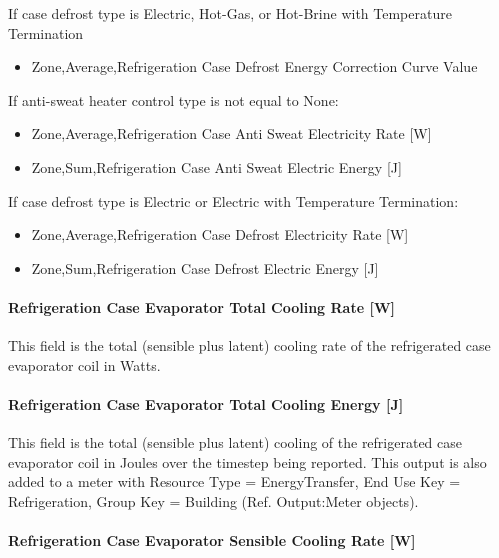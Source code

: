 If case defrost type is Electric, Hot-Gas, or Hot-Brine with Temperature Termination

\begin{itemize}
\tightlist
\item
  Zone,Average,Refrigeration Case Defrost Energy Correction Curve Value
\end{itemize}

If anti-sweat heater control type is not equal to None:

\begin{itemize}
\item
  Zone,Average,Refrigeration Case Anti Sweat Electricity Rate {[}W{]}
\item
  Zone,Sum,Refrigeration Case Anti Sweat Electric Energy {[}J{]}
\end{itemize}

If case defrost type is Electric or Electric with Temperature Termination:

\begin{itemize}
\item
  Zone,Average,Refrigeration Case Defrost Electricity Rate {[}W{]}
\item
  Zone,Sum,Refrigeration Case Defrost Electric Energy {[}J{]}
\end{itemize}

\paragraph{Refrigeration Case Evaporator Total Cooling Rate {[}W{]}}\label{refrigeration-case-evaporator-total-cooling-rate-w}

This field is the total (sensible plus latent) cooling rate of the refrigerated case evaporator coil in Watts.

\paragraph{Refrigeration Case Evaporator Total Cooling Energy {[}J{]}}\label{refrigeration-case-evaporator-total-cooling-energy-j}

This field is the total (sensible plus latent) cooling of the refrigerated case evaporator coil in Joules over the timestep being reported. This output is also added to a meter with Resource Type = EnergyTransfer, End Use Key = Refrigeration, Group Key = Building (Ref. Output:Meter objects).

\paragraph{Refrigeration Case Evaporator Sensible Cooling Rate {[}W{]}}\label{refrigeration-case-evaporator-sensible-cooling-rate-w}

